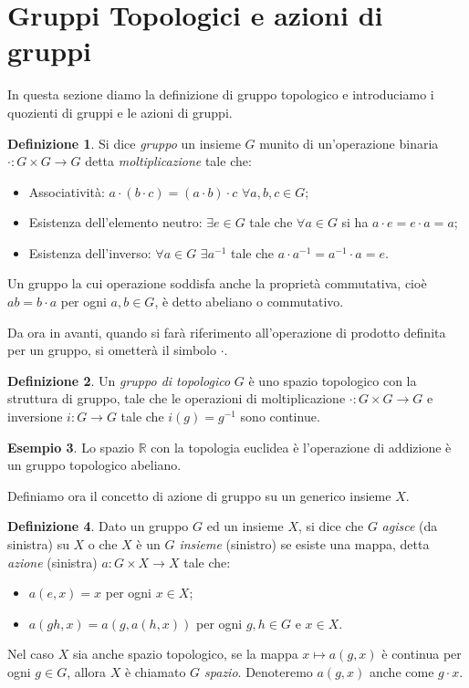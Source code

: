 \documentclass[12pt,a4paper]{report}
\theoremstyle{definition}
\newtheorem{Def}{Definizione}[chapter]
\theoremstyle{Theorem}
\theoremstyle{definition}
\newtheorem{Ex}[Def]{Esempio}
\theoremstyle{definition}
\theoremstyle{definition}
\begin{document}
\section{Gruppi Topologici e azioni di gruppi} \label{Sec:2.1}
In questa sezione diamo la definizione di gruppo topologico e introduciamo i quozienti di gruppi e le azioni di gruppi.
\begin{Def}
	Si dice \textit{gruppo} un insieme $G$ munito di un'operazione binaria $\cdot:G\times G\rightarrow G$ detta \textit{moltiplicazione} tale che:
	\begin{itemize}
		\item Associatività: $a\cdot (b\cdot c)=(a\cdot b)\cdot c$ $\forall a,b,c\in G$;
		\item Esistenza dell'elemento neutro: $\exists e\in G$ tale che $\forall a\in G$ si ha $a\cdot e=e\cdot a=a$;
		\item Esistenza dell'inverso: $\forall a\in G$ $\exists a^{-1}$ tale che $a\cdot a^{-1}=a^{-1}\cdot a=e$.
	\end{itemize}
	Un gruppo la cui operazione soddisfa anche la proprietà commutativa, cioè $ab= b\cdot a$ per ogni $a,b\in G$, è detto abeliano o commutativo.
\end{Def}
Da ora in avanti, quando si farà riferimento all'operazione di prodotto definita per un gruppo, si ometterà il simbolo $\cdot$.
\begin{Def}
	Un \textit{gruppo di topologico} $G$ è uno spazio topologico con la struttura di gruppo, tale che le operazioni di moltiplicazione $\cdot:G\times G\rightarrow G$ e inversione $i:G\rightarrow G$ tale che $i(g)=g^{-1}$ sono continue.
\end{Def}
\begin{Ex}
	Lo spazio $\mathbb{R}$ con la topologia euclidea è l'operazione di addizione è un gruppo topologico abeliano.
\end{Ex}
Definiamo ora il concetto di azione di gruppo su un generico insieme $X$.
\begin{Def}
	Dato un gruppo $G$ ed un insieme $X$, si dice che $G$ \textit{agisce} (da sinistra) su $X$ o che $X$ è un \textit{$G$ insieme} (sinistro) se esiste una mappa, detta \textit{azione} (sinistra) $a:G\times X\rightarrow X$ tale che:
	\begin{itemize}
		\item 	$a(e,x)=x$ per ogni $x\in X$;
		\item $a(gh,x)=a(g,a(h,x))$ per ogni $g,h\in G$ e $x\in X$.
	\end{itemize} 
Nel caso $X$ sia anche spazio topologico, se la mappa $x\longmapsto a(g,x)$ è continua per ogni $g\in G$, allora $X$ è chiamato \textit{$G$ spazio}.
Denoteremo $a(g,x)$ anche come $g\cdot x$.
\end{Def}
\end{document}
